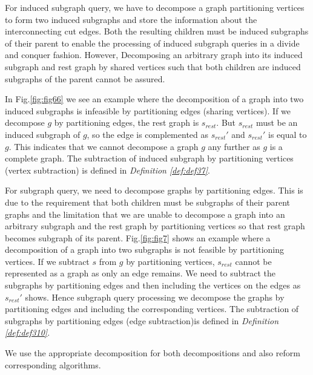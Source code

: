 \begin{enumerate}
\begin{enumerate}
\begin{enumerate}
For induced subgraph query, we have to decompose a graph partitioning vertices to form two induced subgraphs and store the information about the interconnecting cut edges. 
Both the resulting children must be induced subgraphs of their parent to enable the processing of induced subgraph queries in a divide and conquer fashion. 
However, Decomposing an arbitrary graph into its induced subgraph and rest graph by shared vertices such that both children are induced subgraphs of the parent cannot be assured.

In Fig.\ref{fig:fig66} we see an example where the decomposition of a graph into two induced subgraphs is infeasible by partitioning edges (sharing vertices).
If we decompose $g$ by partitioning edges, the rest graph is $s_{rest}$. But $s_{rest}$ must be an induced subgraph of $g$, so the edge is complemented as $s_{rest}'$ and $s_{rest}'$ is equal to $g$. 
This indicates that we cannot decompose a graph $g$ any further as $g$ is a complete graph.
The subtraction of induced subgraph by partitioning vertices (vertex subtraction)  is defined in \textit{Definition \ref{def:def37}}.

For subgraph query, we need to decompose graphs by partitioning edges. 
This is due to the requirement that both children must be subgraphs of their parent graphs
and the limitation that we are unable to decompose a graph into an arbitrary subgraph and the rest graph by partitioning vertices so that rest graph becomes subgraph of its parent.
Fig.\ref{fig:fig7} shows an example where a decomposition of a graph into two subgraphs is not feasible by partitioning vertices.
If we subtract $s$ from $g$ by partitioning vertices, $s_{rest}$ cannot be represented as a graph as only an edge remains. 
We need to subtract the subgraphs by partitioning edges and then including the vertices on the edges as $s_{rest}'$ shows. 
Hence subgraph query processing we decompose the graphs by partitioning edges and including the corresponding vertices.
The subtraction of subgraphs by partitioning edges (edge subtraction)is defined in \textit{Definition \ref{def:def310}}.

We use the appropriate decomposition for both decompositions and also reform corresponding algorithms.


\end{enumerate}
\end{enumerate}
\end{enumerate}
